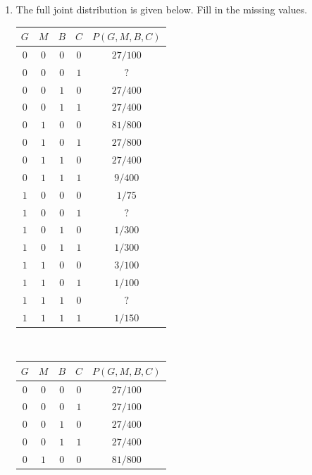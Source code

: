 \documentclass[9pt,a4paper]{extarticle}
\newenvironment{solution}
    {%
    \color{red}
    }
    { 
    \color{black}
    }
\begin{document}
\begin{enumerate}
    \item The full joint distribution is given below. Fill in the missing values.
    \\
    \begin{tabular}{|c|c|c|c|c|}
    \hline 
        $G$ & $M$ & $B$ & $C$ & $P(G, M, B, C)$\\ \hline
        $0$ & $0$ & $0$ & $0$ & $27/100$\\ \hline
        $0$ & $0$ & $0$ & $1$ & $?$\\ \hline
        $0$ & $0$ & $1$ & $0$ & $27/400$\\ \hline
        $0$ & $0$ & $1$ & $1$ & $27/400$\\ \hline
        $0$ & $1$ & $0$ & $0$ & $81/800$\\ \hline
        $0$ & $1$ & $0$ & $1$ & $27/800$\\ \hline
        $0$ & $1$ & $1$ & $0$ & $27/400$\\ \hline
        $0$ & $1$ & $1$ & $1$ & $9/400$\\ \hline
        $1$ & $0$ & $0$ & $0$ & $1/75$\\ \hline
        $1$ & $0$ & $0$ & $1$ & $?$\\ \hline
        $1$ & $0$ & $1$ & $0$ & $1/300$\\ \hline
        $1$ & $0$ & $1$ & $1$ & $1/300$\\ \hline
        $1$ & $1$ & $0$ & $0$ & $3/100$\\ \hline
        $1$ & $1$ & $0$ & $1$ & $1/100$\\ \hline
        $1$ & $1$ & $1$ & $0$ & $?$\\ \hline
        $1$ & $1$ & $1$ & $1$ & $1/150$\\ \hline
    \end{tabular}
    \begin{solution}
    \\
    \begin{tabular}{|c|c|c|c|c|}
    \hline 
        $G$ & $M$ & $B$ & $C$ & $P(G, M, B, C)$\\ \hline
        $0$ & $0$ & $0$ & $0$ & $27/100$\\ \hline
        $0$ & $0$ & $0$ & $1$ & $27/100$\\ \hline
        $0$ & $0$ & $1$ & $0$ & $27/400$\\ \hline
        $0$ & $0$ & $1$ & $1$ & $27/400$\\ \hline
        $0$ & $1$ & $0$ & $0$ & $81/800$\\ \hline

\end{tabular}
\end{solution}
\end{enumerate}
\end{document}
